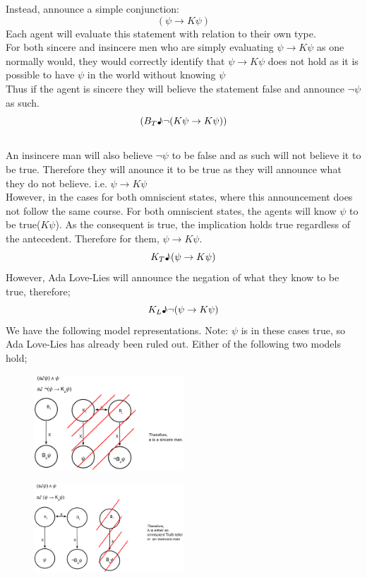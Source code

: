 \documentclass[12pt, titlepage, twoside, a4paper]{report}
\begin{document}
{Instead, announce a simple conjunction:
$$(\psi \to K\psi)$$ 
Each agent will evaluate this statement with relation to their own type.\\
For both sincere and insincere men who are simply evaluating $\psi \to K\psi$ as one normally would, they would correctly identify that $\psi \to K\psi$ does not hold as it is possible to have $\psi$ in the world without knowing $\psi$\\
Thus if the agent is sincere they will believe the statement false and announce $\neg \psi$ as such. 
$$(B_T \text{\textmusicalnote} \neg (K \psi \to K \psi))$$ \\
An insincere man will also believe $\neg \psi$ to be false and as such will not believe it to be true. Therefore they will anounce it to be true as they will announce what they do not believe. i.e. $\psi \to K\psi$\\
However, in the cases for both omniscient states, where this announcement does not follow the same course. For both omniscient states, the agents will know $\psi$ to be true($K\psi$). As the consequent is true, the implication holds true regardless of the antecedent. Therefore for them, $\psi \to K\psi$.
$$K_T\text{\textmusicalnote} (\psi \to K\psi)$$
However, Ada Love-Lies will announce the negation of what they know to be true, therefore;
$$K_L\text{\textmusicalnote} \neg (\psi \to K\psi)$$
We have the following model representations. Note: $\psi$ is in these cases true, so Ada Love-Lies has already been ruled out. Either of the following two models hold;
\begin{figure}[h!]
  \centering
  \includegraphics[width=0.5\textwidth]{slide43.eps}
\end{figure}
\begin{figure}[h!]
  \centering
  \includegraphics[width=0.5\textwidth]{slide44.eps}
\end{figure}

}
\end{document}
